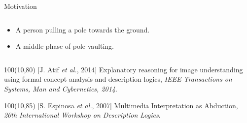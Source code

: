 \documentclass{beamer}
\begin{document}
\begin{frame}{Motivation}
\begin{columns}
\begin{column}{0.6\textwidth}
 \begin{itemize}
  \item A person pulling a pole towards the ground.
  \item A middle phase of pole vaulting.
 \end{itemize}
\end{column}
\end{columns}

\begin{textblock}{100}(10,80)
\tiny 
[J. Atif \textit{et al.}, 2014] Explanatory reasoning for image understanding using formal concept analysis and description logics,	\emph{IEEE Transactions on Systems, Man and Cybernetics, 2014}.
\end{textblock}
\begin{textblock}{100}(10,85)
\tiny 
[S. Espinosa \textit{et al.}, 2007] Multimedia Interpretation as Abduction, \emph{20th International Workshop on Description Logics}.
\end{textblock}

\end{frame}
\end{document}
